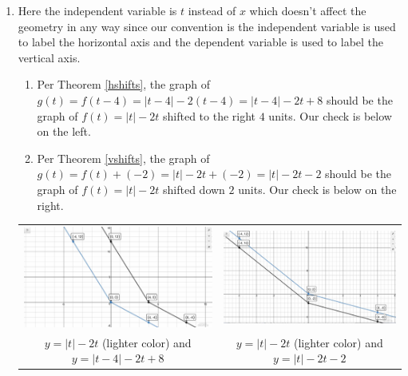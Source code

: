 \documentclass{ximera}
\begin{document}
\begin{example}
\begin{enumerate}
\begin{enumerate}
 \end{enumerate}
 
 \item  Here the independent variable is $t$ instead of $x$ which doesn't affect the geometry in any way since our convention is the independent variable is used to label the horizontal axis and the dependent variable is used to label the vertical axis.  
 
 \begin{enumerate}
 
 \item  Per Theorem \ref{hshifts}, the graph of $g(t) = f(t-4) = |t-4|-2(t-4) = |t-4|-2t+8$ should be the graph of $f(t) = |t|-2t$ shifted to the right $4$ units. Our check is below on the left.
  
 \item Per Theorem \ref{vshifts},  the graph of $g(t) = f(t)+(-2) = |t|-2t+(-2) = |t|-2t-2$ should be the graph of  $f(t) = |t|-2t$ shifted down $2$ units. Our check is below on the right.
 
  \end{enumerate}
 
\begin{center}

\begin{tabular}{cc}

\includegraphics[width=3in]{./TransformationsGraphics/TransformationsEx01a.jpg} & \includegraphics[width=3in]{./TransformationsGraphics/TransformationsEx01b.jpg} \\

$y =  |t|-2t$ (lighter color)  and $y = |t-4|-2t+8$  &  $y =  |t|-2t$ (lighter color) and $y =  |t|-2t-2$ \\


\end{tabular}
\end{center}
\end{enumerate}
\end{example}
\end{document}
